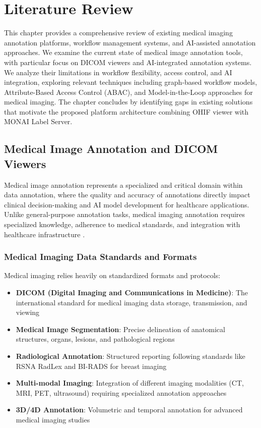 \chapter{Literature Review}
\label{chap:literature-review}

\begin{ChapAbstract}
This chapter provides a comprehensive review of existing medical imaging annotation platforms, workflow management systems, and AI-assisted annotation approaches. We examine the current state of medical image annotation tools, with particular focus on DICOM viewers and AI-integrated annotation systems. We analyze their limitations in workflow flexibility, access control, and AI integration, exploring relevant techniques including graph-based workflow models, Attribute-Based Access Control (ABAC), and Model-in-the-Loop approaches for medical imaging. The chapter concludes by identifying gaps in existing solutions that motivate the proposed platform architecture combining OHIF viewer with MONAI Label Server.
\end{ChapAbstract}

\section{Medical Image Annotation and DICOM Viewers}
\label{sec:medical-annotation-intro}

Medical image annotation represents a specialized and critical domain within data annotation, where the quality and accuracy of annotations directly impact clinical decision-making and AI model development for healthcare applications. Unlike general-purpose annotation tasks, medical imaging annotation requires specialized knowledge, adherence to medical standards, and integration with healthcare infrastructure \cite{litjens2017survey}.

\subsection{Medical Imaging Data Standards and Formats}

Medical imaging relies heavily on standardized formats and protocols:

\begin{itemize}
    \item \textbf{DICOM (Digital Imaging and Communications in Medicine)}: The international standard for medical imaging data storage, transmission, and viewing \cite{pianykh2012digital}
    \item \textbf{Medical Image Segmentation}: Precise delineation of anatomical structures, organs, lesions, and pathological regions
    \item \textbf{Radiological Annotation}: Structured reporting following standards like RSNA RadLex and BI-RADS for breast imaging
    \item \textbf{Multi-modal Imaging}: Integration of different imaging modalities (CT, MRI, PET, ultrasound) requiring specialized annotation approaches
    \item \textbf{3D/4D Annotation}: Volumetric and temporal annotation for advanced medical imaging studies
\end{itemize}

